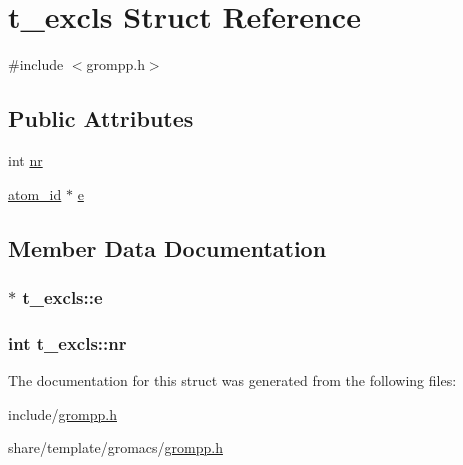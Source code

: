 \hypertarget{structt__excls}{\section{t\-\_\-excls \-Struct \-Reference}
\label{structt__excls}
}


{\ttfamily \#include $<$grompp.\-h$>$}

\subsection*{\-Public \-Attributes}
\begin{DoxyCompactItemize}
\item 
int \hyperlink{structt__excls_a8bb0a111ae9b664a9644c14cf967175a}{nr}
\item 
\hyperlink{include_2types_2simple_8h_ad3f47cdb48677e516e2049719612c737}{atom\-\_\-id} $\ast$ \hyperlink{structt__excls_a8333ac27ead4292444b15feb86315ced}{e}
\end{DoxyCompactItemize}


\subsection{\-Member \-Data \-Documentation}
\hypertarget{structt__excls_a8333ac27ead4292444b15feb86315ced}{
\subsubsection[{e}]{ $\ast$ {\bf t\-\_\-excls\-::e}}}\label{structt__excls_a8333ac27ead4292444b15feb86315ced}
\hypertarget{structt__excls_a8bb0a111ae9b664a9644c14cf967175a}{
\subsubsection[{nr}]{\setlength{\rightskip}{0pt plus 5cm}int {\bf t\-\_\-excls\-::nr}}}\label{structt__excls_a8bb0a111ae9b664a9644c14cf967175a}


\-The documentation for this struct was generated from the following files\-:\begin{DoxyCompactItemize}
\item 
include/\hyperlink{include_2grompp_8h}{grompp.\-h}\item 
share/template/gromacs/\hyperlink{share_2template_2gromacs_2grompp_8h}{grompp.\-h}\end{DoxyCompactItemize}
